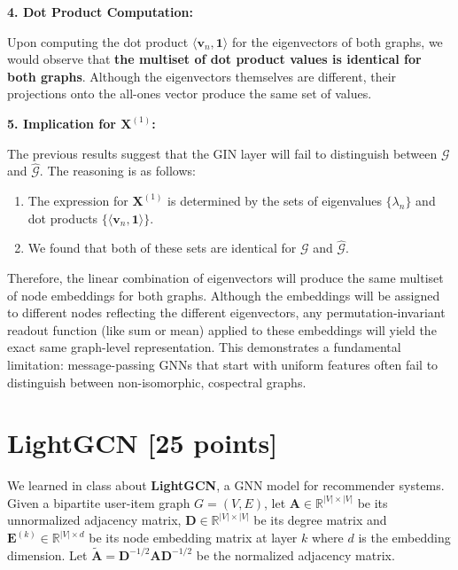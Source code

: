 \documentclass{article}
\numberwithin{figure}{section}
\begin{document}
{	\vspace{1em}
	\textbf{4. Dot Product Computation:}
	
	Upon computing the dot product $\langle\mathbf{v}_n,\mathbf{1}\rangle$ for the eigenvectors of both graphs, we would observe that \textbf{the multiset of dot product values is identical for both graphs}. Although the eigenvectors themselves are different, their projections onto the all-ones vector produce the same set of values.
	
	\vspace{1em}
	\textbf{5. Implication for $\mathbf{X}^{(1)}$:}
	
	The previous results suggest that the GIN layer will fail to distinguish between $\mathcal{G}$ and $\hat{\mathcal{G}}$. The reasoning is as follows:
	\begin{enumerate}
		\item The expression for $\mathbf{X}^{(1)}$ is determined by the sets of eigenvalues $\{\lambda_n\}$ and dot products $\{\langle\mathbf{v}_n, \mathbf{1}\rangle\}$.
		\item We found that both of these sets are identical for $\mathcal{G}$ and $\hat{\mathcal{G}}$.
	\end{enumerate}
	Therefore, the linear combination of eigenvectors will produce the same multiset of node embeddings for both graphs. Although the embeddings will be assigned to different nodes reflecting the different eigenvectors, any permutation-invariant readout function (like sum or mean) applied to these embeddings will yield the exact same graph-level representation. This demonstrates a fundamental limitation: message-passing GNNs that start with uniform features often fail to distinguish between non-isomorphic, cospectral graphs.
}



\section{LightGCN [25 points]}

We learned in class about \textbf{LightGCN}, a GNN model for recommender systems. Given a bipartite user-item graph $G = (V, E)$, let $\mathbf{A} \in \mathbb{R}^{|V| \times |V|}$ be its unnormalized adjacency matrix, $\mathbf{D} \in \mathbb{R}^{|V| \times |V|}$ be its degree matrix and $\mathbf{E}^{(k)} \in \mathbb{R}^{|V| \times d}$ be its node embedding matrix at layer $k$ where $d$ is the embedding dimension. Let $\tilde{\mathbf{A}} = \mathbf{D}^{-1/2} \mathbf{A} \mathbf{D}^{-1/2}$ be the normalized adjacency matrix.\\
\end{document}
